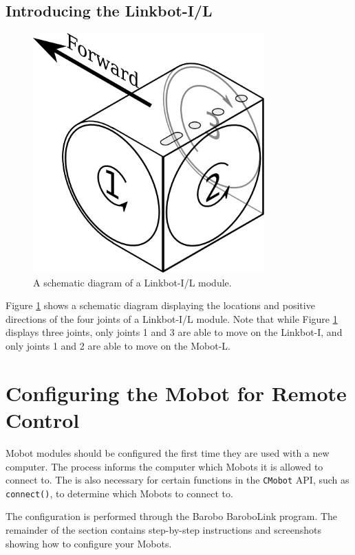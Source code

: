 \documentclass{article}
\begin{document}
\subsection{Introducing the Linkbot-I/L}
\begin{figure}[H]
\begin{center}
\includegraphics[width=3.5in]{images/DOF_joint_diagram.png}
\end{center}
\caption{\label{fig:joint_diagram_il} A schematic diagram of a Linkbot-I/L module.}
\end{figure}

Figure \ref{fig:joint_diagram_il} shows a schematic diagram displaying the
locations and positive directions of the four joints of a Linkbot-I/L module. 
Note that while Figure \ref{fig:joint_diagram_il} displays three joints,
only joints 1 and 3 are able to move on the Linkbot-I, and only joints 1 and 2 are
able to move on the Mobot-L.

\section{\label{sec:pairing}Configuring the Mobot for Remote Control}
Mobot modules should be configured the first time they are used with 
a new computer. The process informs the computer which Mobots it
is allowed to connect to. The is also necessary for certain 
functions in the \texttt{CMobot} API, such as \texttt{connect()},
to determine which Mobots to connect to.

The configuration is performed through the Barobo BaroboLink
program. The remainder of the section contains step-by-step instructions
and screenshots showing how to configure your Mobots.
\end{document}
